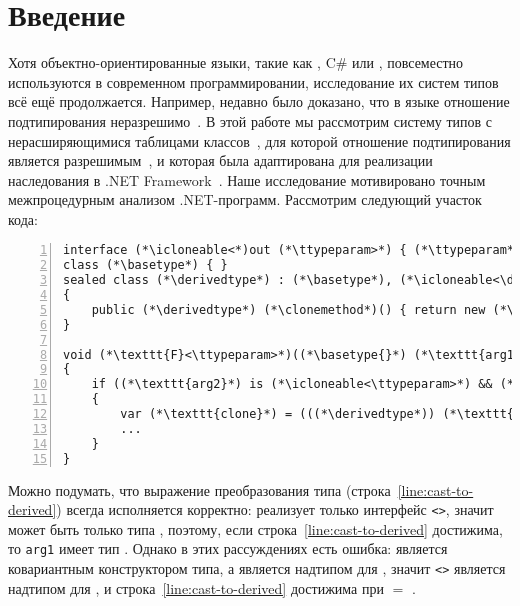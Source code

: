 \section*{Введение}

Хотя объектно-ориентированные языки, такие как \java, C\# или \scala, повсеместно используются в современном программировании, исследование их систем типов всё ещё продолжается. Например, недавно было доказано, что в языке \java отношение подтипирования неразрешимо~\cite{grigore2017java}. В этой работе мы рассмотрим систему типов с нерасширяющимися таблицами классов~\cite{viroli2000recursive}, для которой отношение подтипирования является разрешимым~\cite{kennedy2006decidability}, и которая была адаптирована для реализации наследования в .NET Framework~\cite{ecma2005335}. Наше исследование мотивировано точным межпроцедурным анализом .NET-программ.
Рассмотрим следующий участок кода:
\begin{lstlisting}[basicstyle=\small,numbers=left]
interface (*\icloneable<*)out (*\ttypeparam>*) { (*\ttypeparam*) (*\clonemethod*)(); }
class (*\basetype*) { }
sealed class (*\derivedtype*) : (*\basetype*), (*\icloneable<\derivedtype>*)
{
    public (*\derivedtype*) (*\clonemethod*)() { return new (*\derivedtype*)(); }
}

void (*\texttt{F}<\ttypeparam>*)((*\basetype{}*) (*\texttt{arg1}*), (*\derivedtype*) (*\texttt{arg2}*))
{
    if ((*\texttt{arg2}*) is (*\icloneable<\ttypeparam>*) && (*\texttt{arg1}*) is (*\ttypeparam*))
    {
        var (*\texttt{clone}*) = (((*\derivedtype*)) (*\texttt{arg1}*)).(*\clonemethod*)();(*\label{line:cast-to-derived}*)
        ...
    }
}
\end{lstlisting}
Можно подумать, что выражение преобразования типа (строка~\ref{line:cast-to-derived}) всегда исполняется корректно: \derivedtype{} реализует только интерфейс \icloneable\texttt{<}\derivedtype\texttt{>}, значит \ttypeparam{} может быть только типа \derivedtype{}, поэтому, если строка~\ref{line:cast-to-derived} достижима, то \texttt{arg1} имеет тип \derivedtype. Однако в этих рассуждениях есть ошибка: \icloneable{} является ковариантным конструктором типа, а \basetype{} является надтипом для \derivedtype{}, значит \icloneable\texttt{<}\basetype\texttt{>} является надтипом для \derivedtype{}, и строка~\ref{line:cast-to-derived} достижима при \ttypeparam{} $=$ \basetype{}.

